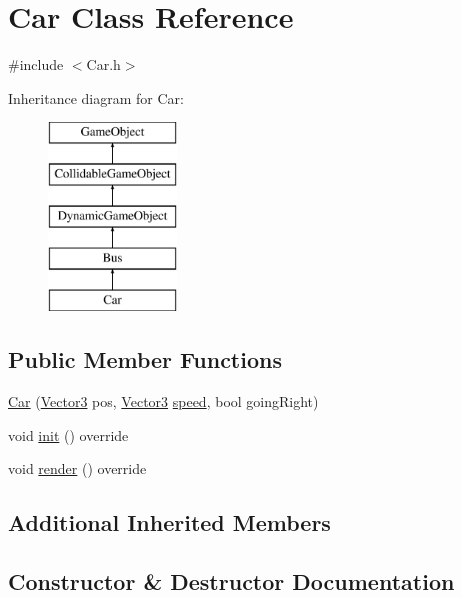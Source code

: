 \hypertarget{class_car}{}\section{Car Class Reference}
\label{class_car}


{\ttfamily \#include $<$Car.\+h$>$}

Inheritance diagram for Car\+:\begin{figure}[H]
\begin{center}
\leavevmode
\includegraphics[height=5.000000cm]{class_car}
\end{center}
\end{figure}
\subsection*{Public Member Functions}
\begin{DoxyCompactItemize}
\item 
\hyperlink{class_car_a8eefa9ceb6ad217618cbd96c3be55aca}{Car} (\hyperlink{class_vector3}{Vector3} pos, \hyperlink{class_vector3}{Vector3} \hyperlink{class_dynamic_game_object_a54cb8a3a5fe8314cd5751f223b2b49ae}{speed}, bool going\+Right)
\item 
void \hyperlink{class_car_ae7d4da15bf41cc2d36465129372f2a71}{init} () override
\item 
void \hyperlink{class_car_a52c7156c403d267444de3d4813fffba2}{render} () override
\end{DoxyCompactItemize}
\subsection*{Additional Inherited Members}


\subsection{Constructor \& Destructor Documentation}
\mbox{\label{class_car_a8eefa9ceb6ad217618cbd96c3be55aca}} 
